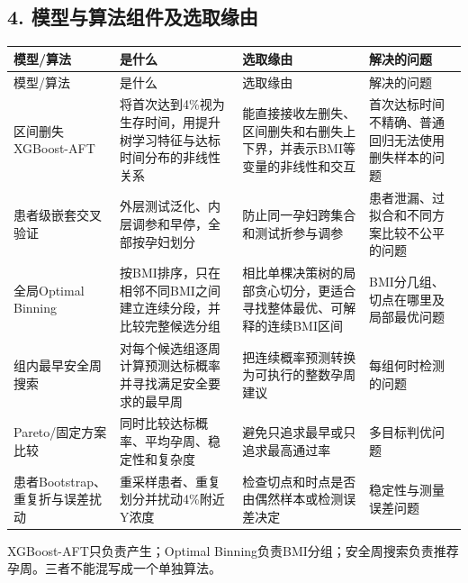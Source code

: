 \documentclass[UTF8,12pt,a4paper]{ctexart}
\begin{document}
\subsection{4. 模型与算法组件及选取缘由}
\begingroup
\footnotesize
\setlength{\tabcolsep}{1.5pt}
\begin{longtable}{|>{\raggedright\arraybackslash}p{}|>{\raggedright\arraybackslash}p{}|>{\raggedright\arraybackslash}p{}|>{\raggedright\arraybackslash}p{}|}
\hline
模型/算法 & 是什么 & 选取缘由 & 解决的问题 \\ \hline
\endfirsthead
\hline
模型/算法 & 是什么 & 选取缘由 & 解决的问题 \\ \hline
\endhead
区间删失XGBoost-AFT & 将首次达到4\%视为生存时间，用提升树学习特征与达标时间分布的非线性关系 & 能直接接收左删失、区间删失和右删失上下界，并表示BMI等变量的非线性和交互 & 首次达标时间不精确、普通回归无法使用删失样本的问题 \\ \hline
患者级嵌套交叉验证 & 外层测试泛化、内层调参和早停，全部按孕妇划分 & 防止同一孕妇跨集合和测试折参与调参 & 患者泄漏、过拟合和不同方案比较不公平的问题 \\ \hline
全局Optimal Binning & 按BMI排序，只在相邻不同BMI之间建立连续分段，并比较完整候选分组 & 相比单棵决策树的局部贪心切分，更适合寻找整体最优、可解释的连续BMI区间 & BMI分几组、切点在哪里及局部最优问题 \\ \hline
组内最早安全周搜索 & 对每个候选组逐周计算预测达标概率并寻找满足安全要求的最早周 & 把连续概率预测转换为可执行的整数孕周建议 & 每组何时检测的问题 \\ \hline
Pareto/固定方案比较 & 同时比较达标概率、平均孕周、稳定性和复杂度 & 避免只追求最早或只追求最高通过率 & 多目标判优问题 \\ \hline
患者Bootstrap、重复折与误差扰动 & 重采样患者、重复划分并扰动4\%附近Y浓度 & 检查切点和时点是否由偶然样本或检测误差决定 & 稳定性与测量误差问题 \\ \hline
\end{longtable}
\endgroup

XGBoost-AFT只负责产生\textsf{}；Optimal Binning负责BMI分组；安全周搜索负责推荐孕周。三者不能混写成一个单独算法。
\end{document}
